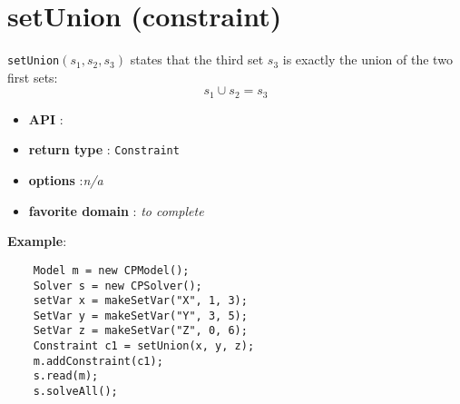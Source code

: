 \label{setunion}
\hypertarget{setunion}{}

\section{setUnion (constraint)}\label{setunion:setunionconstraint}\hypertarget{setunion:setunionconstraint}{}
\begin{notedef}
  \texttt{setUnion}$(s_1,s_2,s_3)$ states that the third set $s_3$ is exactly the union of the two first sets:
$$s_1\cup s_2=s_3$$
\end{notedef}

\begin{itemize}
	\item \textbf{API} : 
	\item \textbf{return type} : \texttt{Constraint}
	\item \textbf{options} :\emph{n/a}
	\item \textbf{favorite domain} : \emph{to complete}
\end{itemize}

\textbf{Example}:
\begin{lstlisting}
	Model m = new CPModel();
	Solver s = new CPSolver();
	setVar x = makeSetVar("X", 1, 3);
	SetVar y = makeSetVar("Y", 3, 5);
	SetVar z = makeSetVar("Z", 0, 6);
	Constraint c1 = setUnion(x, y, z);
	m.addConstraint(c1);
	s.read(m);
	s.solveAll();
\end{lstlisting} 
